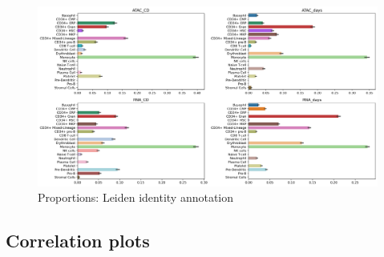 \documentclass[a4paper]{article}
\begin{document}
\begin{figure}[!htb]
  \centering
  \includegraphics[width=\textwidth]{../figures/hematopoiesis/leiden_identity_proportions.png}
  \caption{Proportions: Leiden identity annotation}
\end{figure}

\FloatBarrier
\subsection{Correlation plots}
\end{document}

